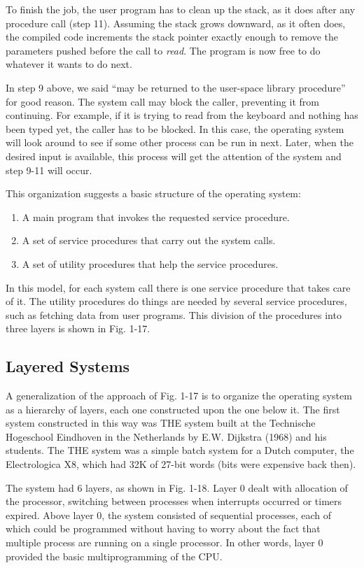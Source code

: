 \documentclass{book}
\newcommand {\sys} [1] {\textsl{#1}}
\begin{document}
To finish the job, the user program has to clean up the stack, as it does after any procedure call (step 11).
Assuming the stack grows downward, as it often does, 
the compiled code increments the stack pointer exactly enough to remove the parameters pushed before the call to \sys{read}.
The program is now free to do whatever it wants to do next.

In step 9 above, we said ``may be returned to the user-space library procedure'' for good reason.
The system call may block the caller, preventing it from continuing.
For example, if it is trying to read from the keyboard and nothing has been typed yet, the caller has to be blocked.
In this case, the operating system will look around to see if some other process can be run in next.
Later, when the desired input is available, this process will get the attention of the system and step 9-11 will occur.

This organization suggests a basic structure of the operating system:
\begin{enumerate}
  \item A main program that invokes the requested service procedure.
  \item A set of service procedures that carry out the system calls.
  \item A set of utility procedures that help the service procedures.
\end{enumerate}

In this model, for each system call there is one service procedure that takes care of it.
The utility procedures do things are needed by several service procedures, such as fetching data from user programs.
This division of the procedures into three layers is shown in Fig. 1-17.

\subsection{Layered Systems}
A generalization of the approach of Fig. 1-17 is to organize the operating system as a hierarchy of layers,
each one constructed upon the one below it.
The first system constructed in this way was THE system 
built at the Technische Hogeschool Eindhoven in the Netherlands by E.W. Dijkstra (1968) and his students.
The THE system was a simple batch system for a Dutch computer, the Electrologica X8,
which had 32K of 27-bit words (bits were expensive back then).

The system had 6 layers, as shown in Fig. 1-18.
Layer 0 dealt with allocation of the processor, switching between processes when interrupts occurred or timers expired.
Above layer 0, the system consisted of sequential processes, each of which could be programmed without having to worry about the fact 
that multiple process are running on a single processor.
In other words, layer 0 provided the basic multiprogramming of the CPU.
\end{document}
